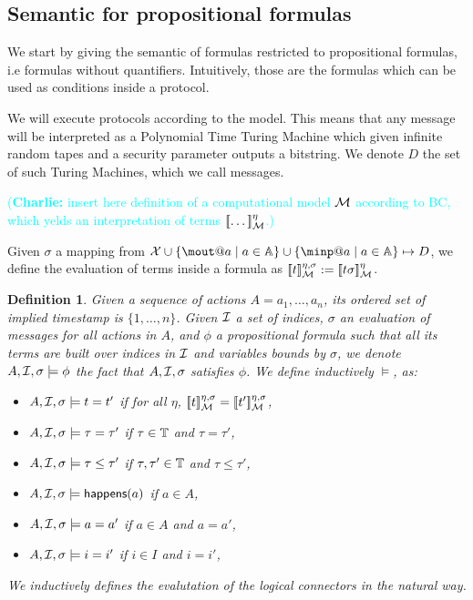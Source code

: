 \documentclass[a4paper]{article}
\newtheorem{definition}{Definition}
\theoremstyle{remark}
\newcommand{\charlie}[1]{\textcolor{cyan}{(\textbf{Charlie:} #1)}}
\begin{document}
\subsection{Semantic for propositional formulas}
We start by giving the semantic of formulas restricted to propositional formulas, i.e formulas without quantifiers. Intuitively, those are the formulas which can be used as conditions inside a protocol.

We will execute protocols according to the \BC model. This means that any message will be interpreted as a Polynomial Time Turing Machine which given infinite random tapes and a security parameter outputs a bitstring. We denote $D$ the set of such Turing Machines, which we call messages.

\charlie{insert here definition of a computational model $\mathcal{M}$ according to BC, which yelds an interpretation of terms $[\![\dots]\!]_{\mathcal{M}}^\eta$.}

Given $\sigma$ a mapping from $\X \cup \{\mout@a \mid a \in \Actions \} \cup \{\minp@a \mid a \in \Actions \} \mapsto D$, we define the evaluation of terms inside a formula as $[\![t]\!]_{\mathcal{M}}^{\eta,\sigma} := [\![t\sigma]\!]_{\mathcal{M}}^\eta$.


\begin{definition}
  Given a sequence of actions $A = a_1,\dots, a_n$, its ordered set of implied timestamp is $\{1,\dots,n\}$. Given $\mathcal{I}$ a set of indices, $\sigma$ an evaluation of messages for all actions in $A$, and $\phi$ a propositional formula such that all its terms are built over indices in $\mathcal{I}$ and variables bounds by $\sigma$, we denote $A,\mathcal{I},\sigma \models \phi$ the fact that $A,\mathcal{I},\sigma$ satisfies $\phi$. We define inductively $\models$, as:
  \begin{itemize}
  \item $A,\mathcal{I},\sigma \models t=t'$ if for all $\eta$, $[\![t]\!]_{\mathcal{M}}^{\eta,\sigma}=[\![t']\!]_{\mathcal{M}}^{\eta,\sigma}$,

  \item $A,\mathcal{I}, \sigma \models \tau = \tau' $ if $\tau \in \mathbb{T}$ and $\tau = \tau'$,

  \item $A,\mathcal{I}, \sigma \models \tau \leq \tau' $ if $\tau,\tau' \in \mathbb{T}$ and $\tau \leq \tau'$,

  \item $A,\mathcal{I}, \sigma \models \textsf{happens}(a)$ if $a \in A$,
  \item $A,\mathcal{I}, \sigma \models a=a'$ if $a \in A$ and $a=a'$,
  \item $A,\mathcal{I}, \sigma \models i=i'$ if $i \in I$ and  $i=i'$,

  \end{itemize}

  We inductively defines the evalutation of the logical connectors in the natural way.
\end{definition}
\end{document}
